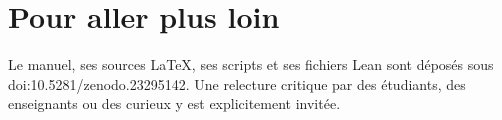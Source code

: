 \section*{Pour aller plus loin}

Le manuel, ses sources \LaTeX, ses scripts et ses fichiers Lean sont déposés sous doi:10.5281/\allowbreak zenodo.23295142.
Une relecture critique par des étudiants, des enseignants ou des curieux y est explicitement invitée.
